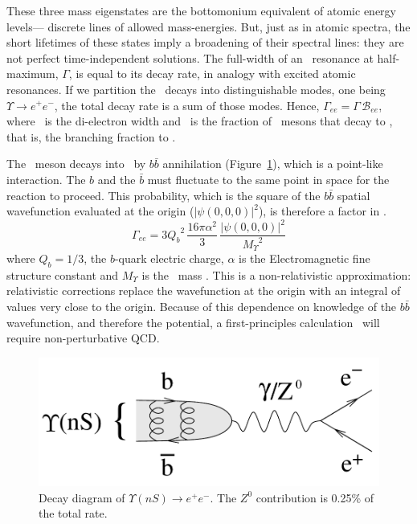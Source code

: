 \documentclass{cornell}
\begin{document}
These three mass eigenstates are the bottomonium equivalent of atomic
energy levels--- discrete lines of allowed mass-energies.  But, just
as in atomic spectra, the short lifetimes of these states imply a
broadening of their spectral lines: they are not perfect
time-independent solutions.  The full-width of an \ups\ resonance at
half-maximum, $\Gamma$, is equal to its decay rate, in analogy with
excited atomic resonances.  If we partition the \ups\ decays into
distinguishable modes, one being $\Upsilon \to e^+e^-$, the total
decay rate is a sum of those modes.  Hence, $\Gamma_{ee} = \Gamma \,
{\mathcal B}_{ee}$, where \gee\ is the di-electron width and \bee\ is
the fraction of \ups\ mesons that decay to \ee, that is, the branching
fraction to \ee.
  
The \ups\ meson decays into \ee\ by $b\bar{b}$ annihilation
(Figure~\ref{diagramgee}), which is a point-like interaction.  The $b$
and the $\bar{b}$ must fluctuate to the same point in space for the
reaction to proceed.  This probability, which is the square of the
$b\bar{b}$ spatial wavefunction evaluated at the origin
($|\psi(0,0,0)|^2$), is therefore a factor in \gee.
\begin{equation}
  \Gamma_{ee} = 3 {Q_b}^2 \, \frac{16 \pi \alpha^2}{3} \, \frac{|\psi(0,0,0)|^2}{{M_\Upsilon}^2}
  \label{eqn:waveatorigin}
\end{equation}
where $Q_b=1/3$, the $b$-quark electric charge, $\alpha$ is the
Electromagnetic fine structure constant and $M_\Upsilon$ is the \ups\
mass \cite{ps}.  This is a non-relativistic approximation:
relativistic corrections replace the wavefunction at the origin with
an integral of values very close to the origin.  Because of this
dependence on knowledge of the $b\bar{b}$ wavefunction, and therefore
the potential, a first-principles calculation \gee\ will require
non-perturbative QCD.

\begin{figure}[p]
  \begin{center}
    \includegraphics[width=0.5\linewidth]{newplots/diagramgee}
  \end{center}
  \caption[Decay diagram of $\Upsilon(nS) \to e^+e^-$]{\label{diagramgee}
  Decay diagram of $\Upsilon(nS) \to e^+e^-$.  The $Z^0$ contribution is
  0.25\% of the total rate.}
\end{figure}
\end{document}
